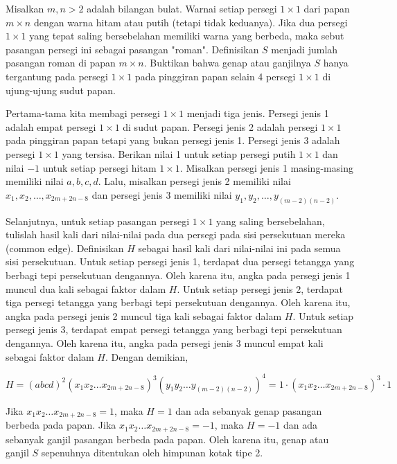 \documentclass[11pt]{scrartcl}
\begin{document}
\begin{soaljawab}
    Misalkan $m,n > 2$ adalah bilangan bulat. Warnai setiap persegi $1\times1$ dari papan $m\times n$ dengan warna hitam atau putih (tetapi tidak keduanya). Jika dua persegi $1\times1$ yang tepat saling bersebelahan memiliki warna yang berbeda, maka sebut pasangan persegi ini sebagai pasangan "roman". Definisikan $S$ menjadi jumlah pasangan roman di papan $m\times n$. Buktikan bahwa genap atau ganjilnya $S$ hanya tergantung pada persegi $1\times1$ pada pinggiran papan selain 4 persegi $1\times1$ di ujung-ujung sudut papan.
    \begin{solusi}
        Pertama-tama kita membagi persegi $1\times1$ menjadi tiga jenis. Persegi jenis 1 adalah empat persegi $1\times1$ di sudut papan. Persegi jenis 2 adalah persegi $1\times1$ pada pinggiran papan tetapi yang bukan persegi jenis 1. Persegi jenis 3 adalah persegi $1\times1$ yang tersisa. Berikan nilai 1 untuk setiap persegi putih $1\times1$ dan nilai $-1$ untuk setiap persegi hitam $1\times1$. Misalkan persegi jenis 1 masing-masing memiliki nilai $a, b, c, d$. Lalu, misalkan persegi jenis 2 memiliki nilai $x_1, x_2, \dots, x_{2m+2n-8}$ dan persegi jenis 3 memiliki nilai $y_1, y_2, \dots, y_{(m-2)(n-2)}$.
        
        Selanjutnya, untuk setiap pasangan persegi $1\times1$ yang saling bersebelahan, tulislah hasil kali dari nilai-nilai pada dua persegi pada sisi persekutuan mereka (common edge). Definisikan $H$ sebagai hasil kali dari nilai-nilai ini pada semua sisi persekutuan. Untuk setiap persegi jenis 1, terdapat dua persegi tetangga yang berbagi tepi persekutuan dengannya. Oleh karena itu, angka pada persegi jenis 1 muncul dua kali sebagai faktor dalam $H$. Untuk setiap persegi jenis 2, terdapat tiga persegi tetangga yang berbagi tepi persekutuan dengannya. Oleh karena itu, angka pada persegi jenis 2 muncul tiga kali sebagai faktor dalam $H$. Untuk setiap persegi jenis 3, terdapat empat persegi tetangga yang berbagi tepi persekutuan dengannya. Oleh karena itu, angka pada persegi jenis 3 muncul empat kali sebagai faktor dalam $H$. Dengan demikian,

        $$H = (abcd)^2(x_1x_2\dots x_{2m+2n-8})^3(y_1y_2 \dots y_{(m-2)(n-2)})^4 = 1 \cdot (x_1x_2\dots x_{2m+2n-8})^3 \cdot 1$$

        Jika $x_1x_2\dots x_{2m+2n-8} = 1$, maka $H = 1$ dan ada sebanyak genap pasangan berbeda pada papan. Jika $x_1x_2\dots x_{2m+2n-8} = -1$, maka $H = -1$ dan ada sebanyak ganjil pasangan berbeda  pada papan. Oleh karena itu, genap atau ganjil $S$ sepenuhnya ditentukan oleh himpunan kotak tipe 2.
    \end{solusi}
\end{soaljawab}
\end{document}
